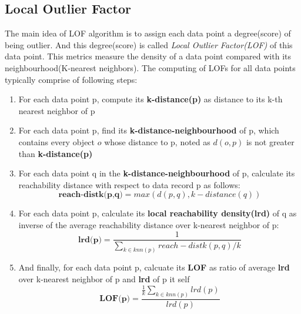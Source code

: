 \documentclass[11pt]{article}       %
\begin{document}
\subsection{Local Outlier Factor} \label{subsect1}

The main idea of LOF algorithm is to assign each data point a degree(score) of being outlier. And this degree(score) is called \textit{Local Outlier Factor(LOF)} of this data point. This metrics measure the density of a data point compared with its neighbourhood(K-nearest neighbors). The computing of LOFs for all data points typically comprise of following steps\cite{Breunig:2000:LID:342009.335388}:

\begin{enumerate} \label{lof_algorithm}
	\item For each data point p, compute its \textbf{k-distance(p)} as distance to its k-th nearest neighbor of p
	\item For each data point p, find its \textbf{k-distance-neighbourhood} of p, which contains every object $o$ whose distance to p, noted as $d(o, p)$ is not greater than \textbf{k-distance(p)}
	\item For each data point q in the \textbf{k-distance-neighbourhood} of p, calculate its reachability distance with respect to data record p as follows:
		\begin{equation} \label{rdist}
			\textbf{reach-distk(p,q)} = max(d(p,q), k-distance(q))
		\end{equation}
	\item For each data point p, calculate its \textbf{local reachability density(lrd)} of q as inverse of the average reachability distance over k-nearest neighbor of p:
		\begin{equation} \label{lrd}
			\textbf{lrd(p)} =  \frac{1}{\sum\limits_{k \in knn(p)} reach-distk(p,q) / k}
		\end{equation}
	\item And finally, for each data point p, calcuate its \textbf{LOF} as ratio of average \textbf{lrd} over k-nearest neighbor of p and \textbf{lrd} of p it self
		\begin{equation} \label{lof}
			\textbf{LOF(p)} = \frac{\frac{1}{k} \sum_{k \in knn(p)} lrd(p)}{lrd(p)}
		\end{equation}
\end{enumerate}
\end{document}
